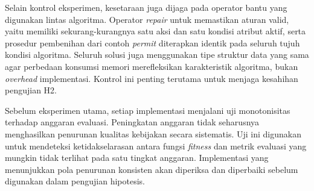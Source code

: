 Selain kontrol eksperimen, kesetaraan juga dijaga pada operator bantu yang digunakan lintas algoritma. 
Operator \textit{repair} untuk memastikan aturan valid, yaitu memiliki sekurang-kurangnya satu aksi dan satu kondisi atribut aktif, serta prosedur pembenihan dari contoh \textit{permit} diterapkan identik pada seluruh tujuh kondisi algoritma. 
Seluruh solusi juga menggunakan tipe struktur data yang sama agar perbedaan konsumsi memori merefleksikan karakteristik algoritma, bukan \textit{overhead} implementasi. 
Kontrol ini penting terutama untuk menjaga kesahihan pengujian H2.

Sebelum eksperimen utama, setiap implementasi menjalani uji monotonisitas terhadap anggaran evaluasi. 
Peningkatan anggaran tidak seharusnya menghasilkan penurunan kualitas kebijakan secara sistematis. 
Uji ini digunakan untuk mendeteksi ketidakselarasan antara fungsi \textit{fitness} dan metrik evaluasi yang mungkin tidak terlihat pada satu tingkat anggaran. 
Implementasi yang menunjukkan pola penurunan konsisten akan diperiksa dan diperbaiki sebelum digunakan dalam pengujian hipotesis.